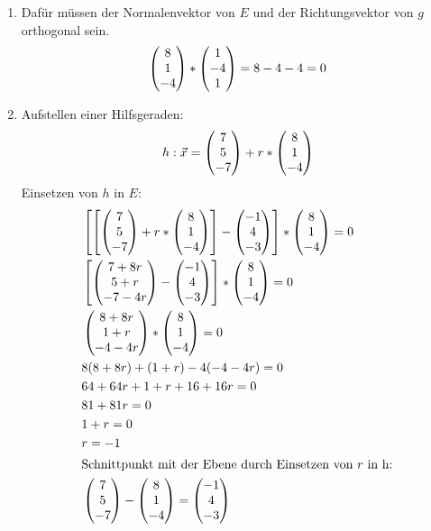 \begin{lsg}{}
	\begin{enumerate}
		\item Dafür müssen der Normalenvektor von $E$ und der Richtungsvektor von $g$ orthogonal sein.
		\begin{equation*}
			\begin{pmatrix} 8\\ 1 \\-4 \end{pmatrix}*\begin{pmatrix} 1\\-4\\1 \end{pmatrix}=8-4-4=0
		\end{equation*}
		\item Aufstellen einer Hilfsgeraden:
		\begin{align*}
			h: \vec x=\begin{pmatrix} 7\\5\\-7 \end{pmatrix}+r*\begin{pmatrix} 8\\ 1 \\-4 \end{pmatrix}
		\end{align*}
		Einsetzen von $h$ in $E$:
		\begin{align*}
			&\left[ \left[\vektor{7\\5\\-7}+r*\vektor{8\\ 1 \\-4}\right] -  \vektor{-1 \\ 4\\ -3}\right]*\vektor{8\\ 1 \\-4}=0\\
			&\left[ \vektor{7+8r\\ 5+r \\-7-4r} -  \vektor{-1 \\ 4\\ -3}\right]*\vektor{8\\ 1 \\-4}=0\\
			&\vektor{8+8r\\ 1+r \\-4-4r}*\vektor{8\\ 1 \\-4}=0\\
			&8(8+8r)+(1+r)-4(-4-4r)=0\\
			&64+64r+1+r+16+16r=0\\
			&81+81r=0\\
			&1+r=0\\
			&r=-1\\
			\intertext{Schnittpunkt mit der Ebene durch Einsetzen von $r$ in h:}
			&\vektor{7\\5\\-7}-\vektor{8\\ 1 \\-4}=\vektor{-1 \\ 4 \\ -3}\\

\end{align*}
\end{enumerate}
\end{lsg}
